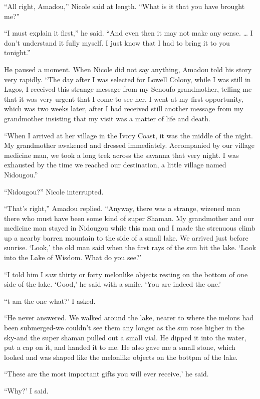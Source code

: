 \documentclass[]{article}
\begin{document}
{{“All right, Amadou,” Nicole said at length.  “What is it that you have brought me?”

“I must explain it first,” he said.  “And even then it may not make any sense.  … I don’t understand it fully myself.  I just know that I had to bring it to you tonight.”

He paused a moment.  When Nicole did not say anything, Amadou told his story very rapidly.  “The day after I was selected for Lowell Colony, while I was still in Lagos, I received this strange message from my Senoufo grandmother, telling me that it was very urgent that I come to see her.  I went at my first opportunity, which was two weeks later, after I had received still another message from my grandmother insisting that my visit was a matter of life and death.

“When I arrived at her village in the Ivory Coast, it was the middle of the night.  My grandmother awakened and dressed immediately.  Accompanied by our village medicine man, we took a long trek across the savanna that very night.  I was exhausted by the time we reached our destination, a little village named Nidougou.”

“Nidougou?” Nicole interrupted.

“That’s right,” Amadou replied.  “Anyway, there was a strange, wizened man there who must have been some kind of super Shaman.  My grandmother and our medicine man stayed in Nidougou while this man and I made the strenuous climb up a nearby barren mountain to the side of a small lake.  We arrived just before sunrise.  ‘Look,’ the old man said when the first rays of the sun hit the lake.  ‘Look into the Lake of Wisdom.  What do you see?’

“I told him I saw thirty or forty melonlike objects resting on the bottom of one side of the lake.  ‘Good,’ he said with a smile.  ‘You are indeed the one.’

“t am the one what?’ I asked.

“He never answered.  We walked around the lake, nearer to where the melons had been submerged-we couldn’t see them any longer as the sun rose higher in the sky-and the super shaman pulled out a small vial.  He dipped it into the water, put a cap on it, and handed it to me.  He also gave me a small stone, which looked and was shaped like the melonlike objects on the bottpm of the lake.

“These are the most important gifts you will ever receive,’ he said.

“Why?’ I said.

}}
\end{document}
